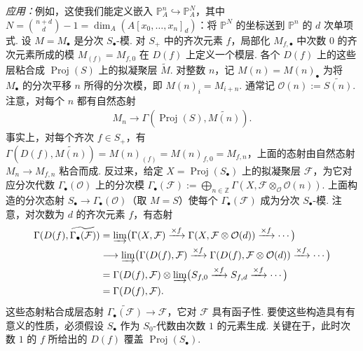 \begin{numpara}
\emph{应用：}例如，这使我们能定义嵌入 $\mathbb P_A^n\hookrightarrow\mathbb P_A^N$，其中 $N=\binom{n+d}{d}-1=\dim_A(A[x_0,\ldots,x_n]_d)$：将 $\mathbb P^N$ 的坐标送到 $\mathbb P^n$ 的 $d$ 次单项式.
设 $M=M_\bullet$ 是分次 $S_\bullet$-模. 对 $S_+$ 中的齐次元素 $f$，局部化 $M_{f,\bullet}$ 中次数 $0$ 的齐次元素所成的模 $M_{(f)}=M_{f,0}$ 在 $D(f)$ 上定义一个模层. 各个 $D(f)$ 上的这些层粘合成 $\operatorname{Proj}(S)$ 上的拟凝聚层 $\widetilde M$. 对整数 $n$，记 $M(n)=M(n)_\bullet$ 为将 $M_\bullet$ 的分次平移 $n$ 所得的分次模，即 $M(n)_i=M_{i+n}$. 通常记 $\mathcal O(n):=\widetilde{S(n)}$. 注意，对每个 $n$ 都有自然态射
\begin{align*}
M_n\longrightarrow\Gamma(\operatorname{Proj}(S),\widetilde{M(n)}).
\end{align*}
事实上，对每个齐次 $f\in S_+$，有 $\Gamma(D(f),\widetilde{M(n)})=M(n)_{(f)}=M(n)_{f,0}=M_{f,n}$，上面的态射由自然态射 $M_n\longrightarrow M_{f,n}$ 粘合而成.
反过来，给定 $X=\operatorname{Proj}(S_\bullet)$ 上的拟凝聚层 $\mathcal F$，为它对应分次代数 $\Gamma_\bullet(\mathcal O)$ 上的分次模 $\Gamma_\bullet(\mathcal F):=\bigoplus_{n\in\mathbb Z}\Gamma(X,\mathcal F\otimes_{\mathcal O}\mathcal O(n))$. 上面构造的分次态射 $S_\bullet\longrightarrow\Gamma_\bullet(\mathcal O)$（取 $M=S$）使每个 $\Gamma_\bullet(\mathcal F)$ 成为分次 $S_\bullet$-模. 注意，对次数为 $d$ 的齐次元素 $f$，有态射
\begin{align*}
\Gamma(D(f),\widetilde{\Gamma_\bullet(\mathcal F)})
&=\varinjlim\bigl(\Gamma(X,\mathcal F)\xrightarrow{\times f}\Gamma(X,\mathcal F\otimes\mathcal O(d))\xrightarrow{\times f}\cdots\bigr)\\
&\longrightarrow\varinjlim\bigl(\Gamma(D(f),\mathcal F)\xrightarrow{\times f}\Gamma(D(f),\mathcal F\otimes\mathcal O(d))\xrightarrow{\times f}\cdots\bigr)\\
&=\Gamma(D(f),\mathcal F)\otimes\varinjlim\bigl(S_{f,0}\xrightarrow{\times f}S_{f,d}\xrightarrow{\times f}\cdots\bigr)\\
&=\Gamma(D(f),\mathcal F).
\end{align*}
这些态射粘合成层态射 $\widetilde{\Gamma_\bullet(\mathcal F)}\longrightarrow\mathcal F$，它对 $\mathcal F$ 具有函子性.
要使这些构造具有有意义的性质，必须假设 $S_\bullet$ 作为 $S_0$-代数由次数 $1$ 的元素生成. 关键在于，此时次数 $1$ 的 $f$ 所给出的 $D(f)$ 覆盖 $\operatorname{Proj}(S_\bullet)$.
\end{numpara}
